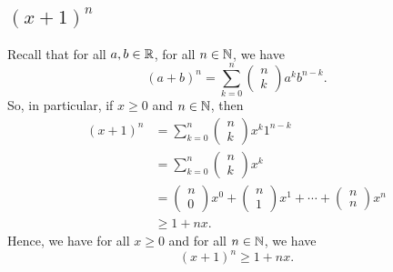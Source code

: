 \documentclass[a4paper]{report}
\begin{document}
\subsection{\( (x+1)^n \)}
Recall that for all \( a,b \in \mathbb{R}  \), for all \( n \in \mathbb{N}  \), we have
\[  (a+b)^{n} = \sum_{ k = 0  }^{  n  } \begin{pmatrix} n \\ k  \end{pmatrix} a^{k } b^{n - k }. \]
So, in particular, if \( x \geq 0  \) and \( n \in \mathbb{N}  \), then
\begin{align*}  (x+1)^{n} &= \sum_{ k = 0  }^{ n } \begin{pmatrix} n \\ k  \end{pmatrix}  x^{k } 1^{n-k} \\ &= \sum_{ k = 0  }^{ n  } \begin{pmatrix} n \\ k  \end{pmatrix}  x^{k}  \\
                          &= \begin{pmatrix} n \\ 0  \end{pmatrix}  x^{0} + \begin{pmatrix} n \\ 1  \end{pmatrix}  x^{1} + \cdots + \begin{pmatrix} n \\ n  \end{pmatrix} x^{n} \\
                          &\geq 1 + nx.
\end{align*}
Hence, we have for all \( x \geq 0  \) and for all \( n \in \mathbb{N}  \), we have
\[  (x+1)^{n} \geq 1 + nx.  \]
\end{document}
